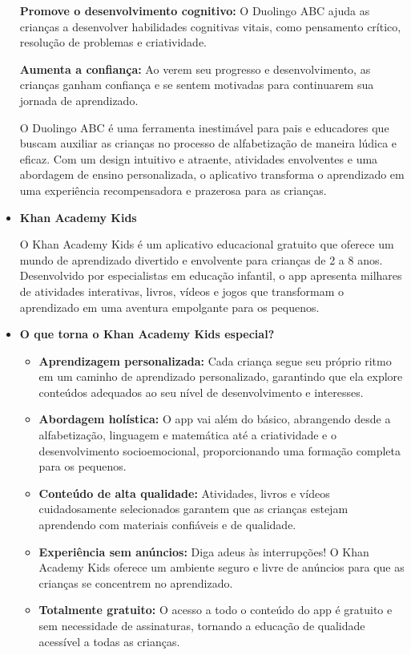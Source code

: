 \begin{itemize}
\textbf{Promove o desenvolvimento cognitivo:} O Duolingo ABC ajuda as crianças a desenvolver habilidades cognitivas vitais, como pensamento crítico, resolução de problemas e criatividade.

\textbf{Aumenta a confiança:} Ao verem seu progresso e desenvolvimento, as crianças ganham confiança e se sentem motivadas para continuarem sua jornada de aprendizado.

O Duolingo ABC é uma ferramenta inestimável para pais e educadores que buscam auxiliar as crianças no processo de alfabetização de maneira lúdica e eficaz. Com um design intuitivo e atraente, atividades envolventes e uma abordagem de ensino personalizada, o aplicativo transforma o aprendizado em uma experiência recompensadora e prazerosa para as crianças.

    \item \textbf{Khan Academy Kids}

    O Khan Academy Kids é um aplicativo educacional gratuito que oferece um mundo de aprendizado divertido e envolvente para crianças de 2 a 8 anos. Desenvolvido por especialistas em educação infantil, o app apresenta milhares de atividades interativas, livros, vídeos e jogos que transformam o aprendizado em uma aventura empolgante para os pequenos.

\item \textbf{O que torna o Khan Academy Kids especial?}

\begin{itemize}
    \item \textbf{Aprendizagem personalizada:} Cada criança segue seu próprio ritmo em um caminho de aprendizado personalizado, garantindo que ela explore conteúdos adequados ao seu nível de desenvolvimento e interesses.
    \item \textbf{Abordagem holística:} O app vai além do básico, abrangendo desde a alfabetização, linguagem e matemática até a criatividade e o desenvolvimento socioemocional, proporcionando uma formação completa para os pequenos.
    \item \textbf{Conteúdo de alta qualidade:} Atividades, livros e vídeos cuidadosamente selecionados garantem que as crianças estejam aprendendo com materiais confiáveis e de qualidade.
    \item \textbf{Experiência sem anúncios:} Diga adeus às interrupções! O Khan Academy Kids oferece um ambiente seguro e livre de anúncios para que as crianças se concentrem no aprendizado.
    \item \textbf{Totalmente gratuito:} O acesso a todo o conteúdo do app é gratuito e sem necessidade de assinaturas, tornando a educação de qualidade acessível a todas as crianças.
\end{itemize}


\end{itemize}
